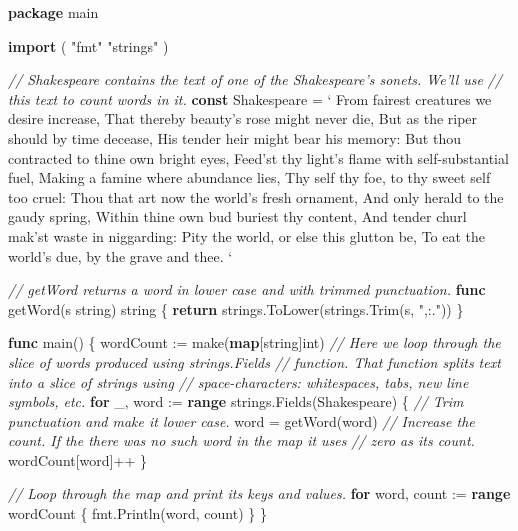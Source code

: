 \documentclass[]{book}
\newenvironment{Shaded}{\begin{snugshade}}{\end{snugshade}}
\newcommand{\BuiltInTok}[1]{#1}
\newcommand{\CommentTok}[1]{\textcolor[rgb]{0.56,0.35,0.01}{\textit{#1}}}
\newcommand{\DataTypeTok}[1]{\textcolor[rgb]{0.13,0.29,0.53}{#1}}
\newcommand{\KeywordTok}[1]{\textcolor[rgb]{0.13,0.29,0.53}{\textbf{#1}}}
\newcommand{\NormalTok}[1]{#1}
\newcommand{\StringTok}[1]{\textcolor[rgb]{0.31,0.60,0.02}{#1}}
\begin{document}
\begin{Shaded}
\begin{Highlighting}[]
\KeywordTok{package}\NormalTok{ main}

\KeywordTok{import}\NormalTok{ (}
    \StringTok{"fmt"}
    \StringTok{"strings"}
\NormalTok{)}

\CommentTok{// Shakespeare contains the text of one of the Shakespeare's sonets. We'll use}
\CommentTok{// this text to count words in it.}
\KeywordTok{const}\NormalTok{ Shakespeare = }\StringTok{`}
\StringTok{From fairest creatures we desire increase,}
\StringTok{That thereby beauty's rose might never die,}
\StringTok{But as the riper should by time decease,}
\StringTok{His tender heir might bear his memory:}
\StringTok{But thou contracted to thine own bright eyes,}
\StringTok{Feed'st thy light's flame with self-substantial fuel,}
\StringTok{Making a famine where abundance lies,}
\StringTok{Thy self thy foe, to thy sweet self too cruel:}
\StringTok{Thou that art now the world's fresh ornament,}
\StringTok{And only herald to the gaudy spring,}
\StringTok{Within thine own bud buriest thy content,}
\StringTok{And tender churl mak'st waste in niggarding:}
\StringTok{  Pity the world, or else this glutton be,}
\StringTok{  To eat the world's due, by the grave and thee.}
\StringTok{`}

\CommentTok{// getWord returns a word in lower case and with trimmed punctuation.}
\KeywordTok{func}\NormalTok{ getWord(s }\DataTypeTok{string}\NormalTok{) }\DataTypeTok{string}\NormalTok{ \{}
    \KeywordTok{return}\NormalTok{ strings.ToLower(strings.Trim(s, }\StringTok{",:."}\NormalTok{))}
\NormalTok{\}}

\KeywordTok{func}\NormalTok{ main() \{}
\NormalTok{    wordCount := }\BuiltInTok{make}\NormalTok{(}\KeywordTok{map}\NormalTok{[}\DataTypeTok{string}\NormalTok{]}\DataTypeTok{int}\NormalTok{)}
    \CommentTok{// Here we loop through the slice of words produced using strings.Fields}
    \CommentTok{// function. That function splits text into a slice of strings using}
    \CommentTok{// space-characters: whitespaces, tabs, new line symbols, etc.}
    \KeywordTok{for}\NormalTok{ _, word := }\KeywordTok{range}\NormalTok{ strings.Fields(Shakespeare) \{}
        \CommentTok{// Trim punctuation and make it lower case.}
\NormalTok{        word = getWord(word)}
        \CommentTok{// Increase the count. If the there was no such word in the map it uses}
        \CommentTok{// zero as its count.}
\NormalTok{        wordCount[word]++}
\NormalTok{    \}}

    \CommentTok{// Loop through the map and print its keys and values.}
    \KeywordTok{for}\NormalTok{ word, count := }\KeywordTok{range}\NormalTok{ wordCount \{}
\NormalTok{        fmt.Println(word, count)}
\NormalTok{    \}}
\NormalTok{\}}
\end{Highlighting}
\end{Shaded}
\end{document}
